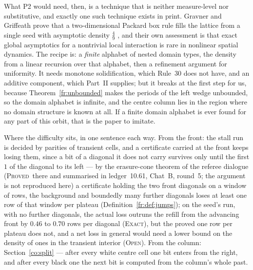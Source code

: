 \documentclass[11pt]{article}
\theoremstyle{definition}
\theoremstyle{remark}
\newcommand{\PROVED}{\textsc{Proved}}
\newcommand{\EXACT}{\textsc{Exact}}
\newcommand{\OPEN}{\textsc{Open}}
\begin{document}
What P2 would need, then, is a technique that is neither measure-level nor substitutive, and exactly one
such technique exists in print. Gravner and Griffeath prove that a two-dimensional Packard box rule
fills the lattice from a single seed with asymptotic density $\tfrac49$ \cite{GGBox,GGZ2}, and their own
assessment is that exact global asymptotics for a nontrivial local interaction is rare in nonlinear
spatial dynamics. The recipe is: a \emph{finite} alphabet of nested domain types, the density from a
linear recursion over that alphabet, then a refinement argument for uniformity. It needs monotone
solidification, which Rule~30 does not have, and an additive component, which Part~II supplies; but it
breaks at the first step for us, because Theorem~\ref{fr:unbounded} makes the periods of the left wedge
unbounded, so the domain alphabet is infinite, and the centre column lies in the region where no domain
structure is known at all. If a finite domain alphabet is ever found for any part of this orbit, that is
the paper to imitate.

Where the difficulty sits, in one sentence each way. From the front: the stall run is decided by parities of transient cells, and a certificate carried at the front keeps losing them, since a bit of a diagonal it does not carry survives only until the first $1$ of the diagonal to its left --- by the erasure-cone theorem of the referee dialogue (\PROVED\ there and summarised in ledger~10.61, Chat~B, round~5; the argument is not reproduced here) a certificate holding the two front diagonals on a window of rows, the background and boundedly many further diagonals loses at least one row of that window per plateau (Definition~\ref{fr:def:jumps}); on the seed's run, with no further diagonals, the actual loss outruns the refill from the advancing front by $0.46$ to $0.70$ rows per diagonal (\EXACT), but the proved one row per plateau does not, and a net loss in general would need a lower bound on the density of ones in the transient interior (\OPEN). From the column: Section~\ref{co:split} --- after every white centre cell one bit enters from the right, and after every black one the next bit is computed from the column's whole past.
\end{document}
